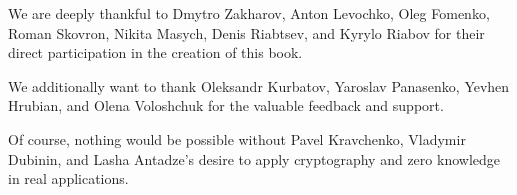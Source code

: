 \documentclass[../lecture-notes-148x210.tex]{subfiles}
\begin{document}
We are deeply thankful to Dmytro Zakharov, Anton Levochko, Oleg Fomenko, Roman Skovron, Nikita Masych, Denis Riabtsev, and Kyrylo Riabov for their direct participation in the creation of this book.

We additionally want to thank Oleksandr Kurbatov, Yaroslav Panasenko, Yevhen Hrubian, and Olena Voloshchuk for the valuable feedback and support.

Of course, nothing would be possible without Pavel Kravchenko, Vladymir Dubinin, and Lasha Antadze's desire to apply cryptography and zero knowledge in real applications.
\end{document}
